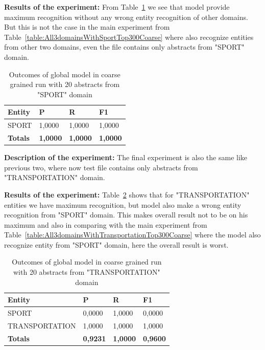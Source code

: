 \documentclass[thesis=M,english]{FITthesis}[2018/05/30]
\begin{document}
\textbf{Results of the experiment:} From Table~\ref{table:GlobalDomainWithSportTop20Coarse} we see that model provide maximum recognition without any wrong entity recognition of other domains. But this is not the case in the main experiment from Table~\ref{table:All3domainsWithSportTop300Coarse} where also recognize entities from other two domains, even the file contains only abstracts from "SPORT" domain. 

	\begin{table}[H]\centering
		\begin{tabular}{|l|l|l|l|}
			\hline {\textbf{Entity}} & {\textbf{P}} & {\textbf{R}} & {\textbf{F1}}\\\hline
				SPORT & 1,0000 & 1,0000 & 1,0000\\\hline
				\textbf{Totals} & \textbf{1,0000} & \textbf{1,0000} & \textbf{1,0000}\\\hline
		\end{tabular}
		\caption{Outcomes of global model in coarse grained run with 20 abstracts from "SPORT" domain \label{table:GlobalDomainWithSportTop20Coarse}}
	\end{table}	

\textbf{Description of the experiment:} The final experiment is also the same like previous two, where now test file contains only abstracts from "TRANSPORTATION" domain.

\textbf{Results of the experiment:} Table~\ref{table:GlobalDomainWithTransportationTop20Coarse} shows that for "TRANSPORTATION" entities we have maximum recognition, but model also make a wrong entity recognition from "SPORT" domain. This makes overall result not to be on his maximum and also in comparing with the main experiment from Table~\ref{table:All3domainsWithTransportationTop300Coarse} where the model also recognize entity from "SPORT" domain, here the overall result is worst. 

	\begin{table}[H]\centering
		\begin{tabular}{|l|l|l|l|}
			\hline {\textbf{Entity}} & {\textbf{P}} & {\textbf{R}} & {\textbf{F1}}\\\hline
				SPORT & 0,0000 & 1,0000 & 0,0000\\
				TRANSPORTATION & 1,0000 & 1,0000 & 1,0000\\\hline
				\textbf{Totals} & \textbf{0,9231} & \textbf{1,0000} & \textbf{0,9600}\\\hline
		\end{tabular}
		\caption{Outcomes of global model in coarse grained run with 20 abstracts from "TRANSPORTATION" domain \label{table:GlobalDomainWithTransportationTop20Coarse}}
	\end{table}	
\end{document}

